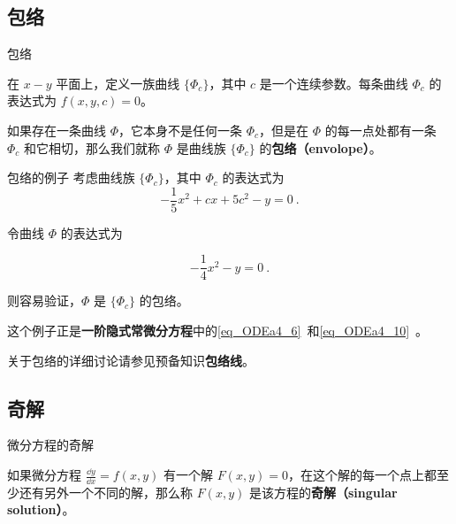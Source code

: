 

\subsection{包络}

\begin{definition}{包络}

在 $x-y$ 平面上，定义一族曲线 $\{\Phi_c\}$，其中 $c$ 是一个连续参数。每条曲线 $\Phi_c$ 的表达式为 $f(x, y, c)=0$。

如果存在一条曲线 $\Phi$，它本身不是任何一条 $\Phi_c$，但是在 $\Phi$ 的每一点处都有一条 $\Phi_c$ 和它相切，那么我们就称 $\Phi$ 是曲线族 $\{\Phi_c\}$ 的\textbf{包络（envolope）}。

\end{definition}

\begin{example}{包络的例子}
考虑曲线族 $\{\Phi_c\}$，其中 $\Phi_c$ 的表达式为
\begin{equation}
-\frac{1}{5}x^2+cx+5c^2-y=0~.
\end{equation}

令曲线 $\Phi$ 的表达式为

\begin{equation}
-\frac{1}{4}x^2-y=0~.
\end{equation}

则容易验证，$\Phi$ 是 $\{\Phi_c\}$ 的包络。

这个例子正是\textbf{一阶隐式常微分方程}中的\autoref{eq_ODEa4_6}~和\autoref{eq_ODEa4_10}~。

\end{example}

关于包络的详细讨论请参见预备知识\textbf{包络线}。


\subsection{奇解}

\begin{definition}{微分方程的奇解}

如果微分方程 $\frac{\dd y}{\dd x}=f(x, y)$ 有一个解 $F(x, y)=0$，在这个解的每一个点上都至少还有另外一个不同的解，那么称 $F(x, y)$ 是该方程的\textbf{奇解（singular solution）}。

\end{definition}

